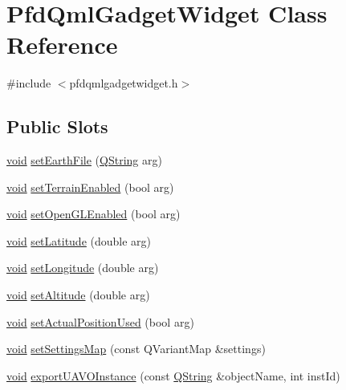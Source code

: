 \hypertarget{class_pfd_qml_gadget_widget}{\section{\-Pfd\-Qml\-Gadget\-Widget \-Class \-Reference}
\label{class_pfd_qml_gadget_widget}
}


{\ttfamily \#include $<$pfdqmlgadgetwidget.\-h$>$}

\subsection*{\-Public \-Slots}
\begin{DoxyCompactItemize}
\item 
\hyperlink{group___u_a_v_objects_plugin_ga444cf2ff3f0ecbe028adce838d373f5c}{void} \hyperlink{class_pfd_qml_gadget_widget_af23ee4cc6d639d2a019f4e8fe4e15060}{set\-Earth\-File} (\hyperlink{group___u_a_v_objects_plugin_gab9d252f49c333c94a72f97ce3105a32d}{\-Q\-String} arg)
\item 
\hyperlink{group___u_a_v_objects_plugin_ga444cf2ff3f0ecbe028adce838d373f5c}{void} \hyperlink{class_pfd_qml_gadget_widget_a7aa0403e143a8d67f4088fd2594bd096}{set\-Terrain\-Enabled} (bool arg)
\item 
\hyperlink{group___u_a_v_objects_plugin_ga444cf2ff3f0ecbe028adce838d373f5c}{void} \hyperlink{class_pfd_qml_gadget_widget_a7938e1ce661bc7530c6b3f595ef557a1}{set\-Open\-G\-L\-Enabled} (bool arg)
\item 
\hyperlink{group___u_a_v_objects_plugin_ga444cf2ff3f0ecbe028adce838d373f5c}{void} \hyperlink{class_pfd_qml_gadget_widget_a331378be36a826e7f1b9678c46661a11}{set\-Latitude} (double arg)
\item 
\hyperlink{group___u_a_v_objects_plugin_ga444cf2ff3f0ecbe028adce838d373f5c}{void} \hyperlink{class_pfd_qml_gadget_widget_ab4bf552f6d0785db30a5c298c5367f34}{set\-Longitude} (double arg)
\item 
\hyperlink{group___u_a_v_objects_plugin_ga444cf2ff3f0ecbe028adce838d373f5c}{void} \hyperlink{class_pfd_qml_gadget_widget_a0dba26ac750789dc0f7a28e0ddbfe45c}{set\-Altitude} (double arg)
\item 
\hyperlink{group___u_a_v_objects_plugin_ga444cf2ff3f0ecbe028adce838d373f5c}{void} \hyperlink{class_pfd_qml_gadget_widget_ae9376fbd87bd39f047287671efac9050}{set\-Actual\-Position\-Used} (bool arg)
\item 
\hyperlink{group___u_a_v_objects_plugin_ga444cf2ff3f0ecbe028adce838d373f5c}{void} \hyperlink{class_pfd_qml_gadget_widget_a09b5734522527945771e50e69b23ae70}{set\-Settings\-Map} (const \-Q\-Variant\-Map \&settings)
\item 
\hyperlink{group___u_a_v_objects_plugin_ga444cf2ff3f0ecbe028adce838d373f5c}{void} \hyperlink{class_pfd_qml_gadget_widget_acbeba4ca943c899325dde1e5390163c7}{export\-U\-A\-V\-O\-Instance} (const \hyperlink{group___u_a_v_objects_plugin_gab9d252f49c333c94a72f97ce3105a32d}{\-Q\-String} \&object\-Name, int inst\-Id)
\end{DoxyCompactItemize}
